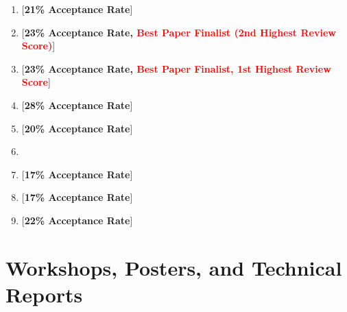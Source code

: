 \begin{enumerate}[topsep=0pt,itemsep=-1ex,partopsep=1ex,parsep=1ex]
        \item {}
            [\textbf{21\% Acceptance Rate}]
        \item {}
            [\textbf{23\% Acceptance Rate, \textcolor{red}{Best Paper Finalist (2nd Highest Review Score)}}]
        \item {}
            [\textbf{23\% Acceptance Rate, \textcolor{red}{Best Paper Finalist, 1st Highest Review Score}}]
        \item {}
            [\textbf{28\% Acceptance Rate}]
        \item {}
            [\textbf{20\% Acceptance Rate}]
        \item {}
        \item {}
            [\textbf{17\% Acceptance Rate}]
        \item {}
            [\textbf{17\% Acceptance Rate}]
        \item {}
            [\textbf{22\% Acceptance Rate}]
    \end{enumerate}

	\section*{Workshops, Posters, and Technical Reports}	

